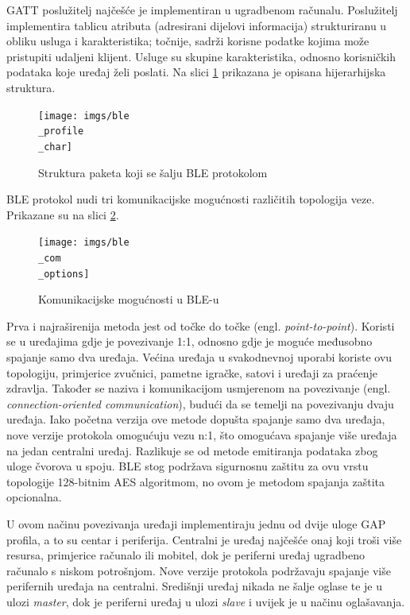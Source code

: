 GATT poslužitelj najčešće je implementiran u ugradbenom računalu. Poslužitelj implementira tablicu atributa (adresirani dijelovi informacija) strukturiranu u obliku usluga i karakteristika; točnije, sadrži korisne podatke kojima može pristupiti udaljeni klijent. Usluge su skupine karakteristika, odnosno korisničkih podataka koje uređaj želi poslati. Na slici \ref{fig:ble_profile_char} prikazana je opisana hijerarhijska struktura. 

\begin{figure}[ht]
	\centering
	\texttt{[image: imgs/ble\\\_profile\\\_char]}
	\caption{Struktura paketa koji se šalju BLE protokolom \cite{ble_profile_char}}
	\label{fig:ble_profile_char}
\end{figure}


BLE protokol nudi tri komunikacijske mogućnosti različitih topologija veze. Prikazane su na slici \ref{fig:ble_com_options}. 

\begin{figure}[ht]
	\centering
	\texttt{[image: imgs/ble\\\_com\\\_options]}
	\caption{Komunikacijske mogućnosti u BLE-u \cite{ble_profiles}}
	\label{fig:ble_com_options}
\end{figure}

Prva i najraširenija metoda jest od točke do točke (engl. \textit{point-to-point}). Koristi se u uređajima gdje je povezivanje 1:1, odnosno gdje je moguće međusobno spajanje samo dva uređaja. Većina uređaja u svakodnevnoj uporabi koriste ovu topologiju, primjerice zvučnici, pametne igračke, satovi i uređaji za praćenje zdravlja. Također se naziva i komunikacijom usmjerenom na povezivanje (engl. \textit{connection-oriented communication}), budući da se temelji na povezivanju dvaju uređaja. Iako početna verzija ove metode dopušta spajanje samo dva uređaja, nove verzije protokola omogućuju vezu n:1, što omogućava spajanje više uređaja na jedan centralni uređaj. Razlikuje se od metode emitiranja podataka zbog uloge čvorova u spoju. BLE stog podržava sigurnosnu zaštitu za ovu vrstu topologije 128-bitnim AES algoritmom, no ovom je metodom spajanja zaštita opcionalna. 

U ovom načinu povezivanja uređaji implementiraju jednu od dvije uloge GAP profila, a to su centar i periferija. Centralni je uređaj najčešće onaj koji troši više resursa, primjerice računalo ili mobitel, dok je periferni uređaj ugradbeno računalo s niskom potrošnjom. Nove verzije protokola podržavaju spajanje više perifernih uređaja na centralni. Središnji uređaj nikada ne šalje oglase te je u ulozi \textit{master}, dok je periferni uređaj u ulozi \textit{slave} i uvijek je u načinu oglašavanja. 

